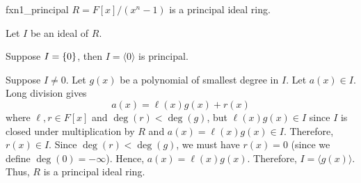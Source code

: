 \begin{Theorem}{}{fxn1_principal}
    $ R=F[x]/(x^n-1) $ is a principal ideal ring.
\end{Theorem}

\begin{Proof}{}{}
    Let $ I $ be an ideal of $ R $.

    Suppose $ I=\{0\} $, then $ I=\langle 0\rangle $ is principal.

    Suppose $ I\neq 0 $. Let $ g(x) $ be a polynomial of smallest
    degree in $ I $. Let $ a(x)\in I $. Long division
    gives
    \[ a(x)=\ell(x)g(x)+r(x) \]
    where $ \ell,r\in F[x] $ and $ \deg(r)<\deg(g) $, but $ \ell(x)g(x)\in I $
    since $ I $ is closed under multiplication by $ R $ and
    $ a(x)=\ell(x)g(x)\in I $. Therefore, $ r(x)\in I $.
    Since $ \deg(r) <\deg(g) $, we must have $ r(x)=0 $ (since we define
    $ \deg(0)=-\infty $). Hence, $ a(x)=\ell(x)g(x) $. Therefore,
    $ I=\langle g(x) \rangle $. Thus, $ R $ is a principal ideal ring.
\end{Proof}
